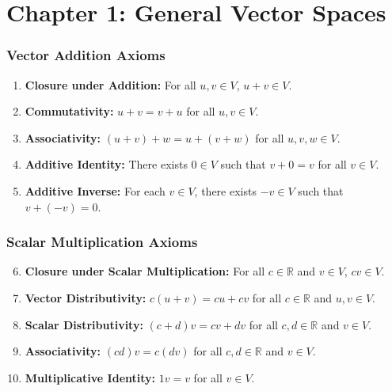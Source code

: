 \section{Chapter 1: General Vector Spaces}

\subsubsection*{Vector Addition Axioms}
\begin{enumerate}[itemsep=0.8em, topsep=0.5em]
    \item \textbf{Closure under Addition:} 
    For all $u, v \in V$, $u + v \in V$.
    
    \item \textbf{Commutativity:} 
    $u + v = v + u$ for all $u, v \in V$.
    
    \item \textbf{Associativity:} 
    $(u + v) + w = u + (v + w)$ for all $u, v, w \in V$.
    
    \item \textbf{Additive Identity:} 
    There exists $0 \in V$ such that $v + 0 = v$ for all $v \in V$.
    
    \item \textbf{Additive Inverse:} 
    For each $v \in V$, there exists $-v \in V$ such that $v + (-v) = 0$.
\end{enumerate}

\subsubsection*{Scalar Multiplication Axioms}
\begin{enumerate}[itemsep=0.8em, topsep=0.5em]
    \setcounter{enumi}{5}
    \item \textbf{Closure under Scalar Multiplication:} 
    For all $c \in \mathbb{R}$ and $v \in V$, $cv \in V$.
    
    \item \textbf{Vector Distributivity:} 
    $c(u + v) = cu + cv$ for all $c \in \mathbb{R}$ and $u, v \in V$.
    
    \item \textbf{Scalar Distributivity:} 
    $(c + d)v = cv + dv$ for all $c, d \in \mathbb{R}$ and $v \in V$.
    
    \item \textbf{Associativity:} 
    $(cd)v = c(dv)$ for all $c, d \in \mathbb{R}$ and $v \in V$.
    
    \item \textbf{Multiplicative Identity:} 
    $1v = v$ for all $v \in V$.
\end{enumerate}

